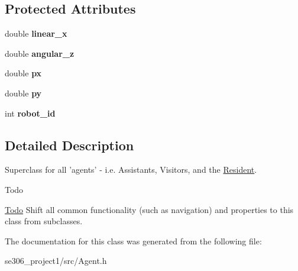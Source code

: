 \subsection*{Protected Attributes}
\begin{DoxyCompactItemize}
\item 
\hypertarget{classAgent_a77dfc60513d8c90b2848297e09fffba7}{double {\bfseries linear\-\_\-x}}\label{classAgent_a77dfc60513d8c90b2848297e09fffba7}

\item 
\hypertarget{classAgent_affc842049c5010a5f8bd99a62d650a25}{double {\bfseries angular\-\_\-z}}\label{classAgent_affc842049c5010a5f8bd99a62d650a25}

\item 
\hypertarget{classAgent_af51536ae3b511b53726b84b9226cc772}{double {\bfseries px}}\label{classAgent_af51536ae3b511b53726b84b9226cc772}

\item 
\hypertarget{classAgent_a048e8b32d02a2fd58f046a444a287015}{double {\bfseries py}}\label{classAgent_a048e8b32d02a2fd58f046a444a287015}

\item 
\hypertarget{classAgent_aefcf2085a669d7e91d932e7cc3ee88ce}{int {\bfseries robot\-\_\-id}}\label{classAgent_aefcf2085a669d7e91d932e7cc3ee88ce}

\end{DoxyCompactItemize}


\subsection{Detailed Description}
Superclass for all 'agents' -\/ i.\-e. Assistants, Visitors, and the \hyperlink{classResident}{Resident}. 

\begin{DoxyRefDesc}{Todo}
\item[\hyperlink{todo__todo000001}{Todo}]Shift all common functionality (such as navigation) and properties to this class from subclasses.\end{DoxyRefDesc}


The documentation for this class was generated from the following file\-:\begin{DoxyCompactItemize}
\item 
se306\-\_\-project1/src/Agent.\-h\end{DoxyCompactItemize}
